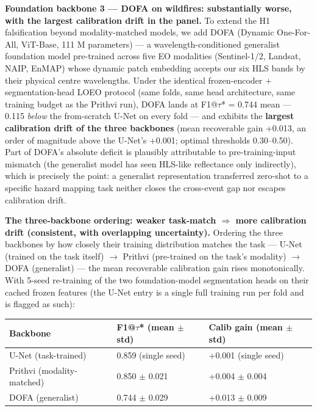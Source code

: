 \textbf{Foundation backbone 3 --- DOFA on wildfires: substantially worse, with
the largest calibration drift in the panel.} To extend the H1
falsification beyond modality-matched models, we add DOFA (Dynamic
One-For-All, ViT-Base, 111 M parameters) --- a wavelength-conditioned
generalist foundation model pre-trained across five EO modalities
(Sentinel-1/2, Landsat, NAIP, EnMAP) whose dynamic patch embedding
accepts our six HLS bands by their physical centre wavelengths. Under
the identical frozen-encoder + segmentation-head LOEO protocol (same
folds, same head architecture, same training budget as the Prithvi
run), DOFA lands at F1@$\tau$* = 0.744 mean --- 0.115 \emph{below} the
from-scratch U-Net on every fold --- and exhibits the \textbf{largest
calibration drift of the three backbones} (mean recoverable gain
+0.013, an order of magnitude above the U-Net's +0.001; optimal
thresholds 0.30--0.50). Part of DOFA's absolute deficit is plausibly
attributable to pre-training-input mismatch (the generalist model has
seen HLS-like reflectance only indirectly), which is precisely the
point: a generalist representation transferred zero-shot to a specific
hazard mapping task neither closes the cross-event gap nor escapes
calibration drift.

\textbf{The three-backbone ordering: weaker task-match $\Rightarrow$ more calibration
drift (consistent, with overlapping uncertainty).} Ordering the three
backbones by how closely their training distribution matches the task ---
U-Net (trained on the task itself) $\rightarrow$ Prithvi (pre-trained on the task's
modality) $\rightarrow$ DOFA (generalist) --- the mean recoverable calibration gain
rises monotonically. With 5-seed re-training of the two foundation-model
segmentation heads on their cached frozen features (the U-Net entry is
a single full training run per fold and is flagged as such):

{\def\LTcaptype{none} %
\begin{longtable}[]{@{}lll@{}}
\toprule\noalign{}
Backbone & F1@$\tau$* (mean $\pm$ std) & Calib gain (mean $\pm$ std) \\
\midrule\noalign{}
\endhead
\bottomrule\noalign{}
\endlastfoot
U-Net (task-trained) & 0.859 (single seed) & +0.001 (single seed) \\
Prithvi (modality-matched) & 0.850 $\pm$ 0.021 & +0.004 $\pm$ 0.004 \\
DOFA (generalist) & 0.744 $\pm$ 0.029 & +0.013 $\pm$ 0.009 \\
\end{longtable}
}

